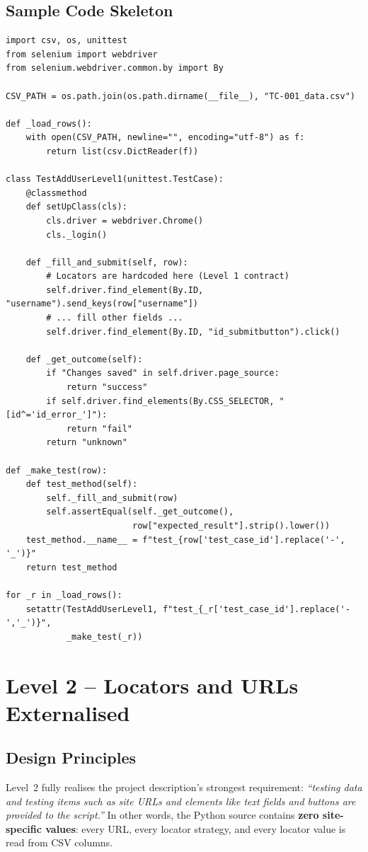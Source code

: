 \documentclass[twoside,final]{hcmut-report}
\begin{document}
\subsection{Sample Code Skeleton}
\begin{lstlisting}[caption={Generic Level~1 test-factory pattern},label={lst:lvl1-factory}]
import csv, os, unittest
from selenium import webdriver
from selenium.webdriver.common.by import By

CSV_PATH = os.path.join(os.path.dirname(__file__), "TC-001_data.csv")

def _load_rows():
    with open(CSV_PATH, newline="", encoding="utf-8") as f:
        return list(csv.DictReader(f))

class TestAddUserLevel1(unittest.TestCase):
    @classmethod
    def setUpClass(cls):
        cls.driver = webdriver.Chrome()
        cls._login()

    def _fill_and_submit(self, row):
        # Locators are hardcoded here (Level 1 contract)
        self.driver.find_element(By.ID, "username").send_keys(row["username"])
        # ... fill other fields ...
        self.driver.find_element(By.ID, "id_submitbutton").click()

    def _get_outcome(self):
        if "Changes saved" in self.driver.page_source:
            return "success"
        if self.driver.find_elements(By.CSS_SELECTOR, "[id^='id_error_']"):
            return "fail"
        return "unknown"

def _make_test(row):
    def test_method(self):
        self._fill_and_submit(row)
        self.assertEqual(self._get_outcome(),
                         row["expected_result"].strip().lower())
    test_method.__name__ = f"test_{row['test_case_id'].replace('-', '_')}"
    return test_method

for _r in _load_rows():
    setattr(TestAddUserLevel1, f"test_{_r['test_case_id'].replace('-','_')}",
            _make_test(_r))
\end{lstlisting}

\section{Level 2 -- Locators and URLs Externalised}

\subsection{Design Principles}
Level~2 fully realises the project description's strongest requirement: \emph{``testing data and testing items such as site URLs and elements like text fields and buttons are provided to the script.''} In other words, the Python source contains \textbf{zero site-specific values}: every URL, every locator strategy, and every locator value is read from CSV columns.
\end{document}
